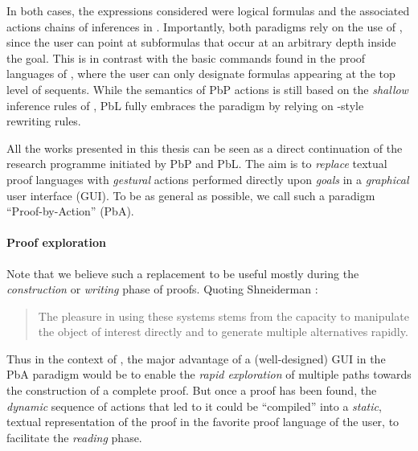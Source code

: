 In both cases, the expressions considered were logical formulas and the
associated actions chains of inferences in . Importantly, both paradigms rely
on the use of \emph{}, since the user can point at subformulas
that occur at an arbitrary depth inside the goal. This is in contrast with the
basic commands found in the proof languages of , where the user can only
designate formulas appearing at the top level of sequents. While the
semantics of PbP actions is still based on the \emph{shallow} inference rules of
, PbL fully embraces the  paradigm by relying on
-style rewriting rules.

\begin{emphpar}
  All the works presented in this thesis can be seen as a direct continuation of
  the research programme initiated by PbP and PbL. The aim is to \emph{replace}
  textual proof languages with \emph{gestural} actions performed directly upon
  \emph{goals} in a \emph{graphical} user interface (GUI). To be as general as
  possible, we call such a paradigm ``Proof-by-Action'' (PbA).
\end{emphpar}

\paragraph{Proof exploration}

Note that we believe such a replacement to be useful mostly during the
\emph{construction} or \emph{writing} phase of proofs. Quoting Shneiderman
\cite{shneiderman_direct_1983}:
\begin{quote}
  The pleasure in using these systems stems from the capacity to manipulate the
object of interest directly and to generate multiple alternatives rapidly.
\end{quote}
Thus in the context of , the major advantage of a (well-designed) GUI in the
PbA paradigm would be to enable the \emph{rapid exploration} of multiple paths
towards the construction of a complete proof. But once a proof has been found,
the \emph{dynamic} sequence of actions that led to it could be ``compiled'' into
a \emph{static}, textual representation of the proof in the favorite proof
language of the user, to facilitate the \emph{reading} phase.

